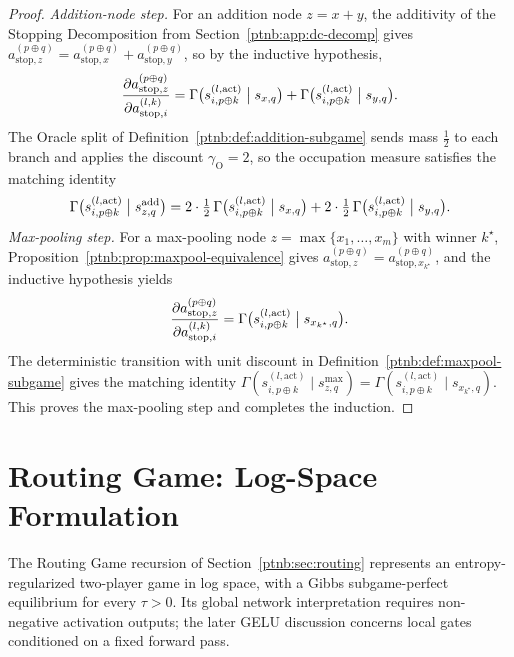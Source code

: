 \begin{proof}
\emph{Addition-node step.} For an addition node $z = x + y$, the additivity of the Stopping
Decomposition from Section~\ref{ptnb:app:dc-decomp} gives $a_{\mathrm{stop},z}^{(p \oplus q)} =
    a_{\mathrm{stop},x}^{(p \oplus q)} + a_{\mathrm{stop},y}^{(p \oplus q)}$, so by the inductive
hypothesis,
\begin{align}
    \frac{\partial a_{\mathrm{stop},z}^{(p \oplus q)}}{\partial a_{\mathrm{stop},i}^{(l, k)}}
    = \Gamma\bigl(s_{i, p \oplus k}^{(l, \mathrm{act})} \bigm| s_{x,q}\bigr) + \Gamma\bigl(s_{i, p
    \oplus k}^{(l, \mathrm{act})} \bigm| s_{y,q}\bigr).
\end{align}
The Oracle split of Definition~\ref{ptnb:def:addition-subgame} sends mass $\tfrac12$ to each branch and
applies the discount $\gamma_{\mathrm{O}} = 2$, so the occupation measure satisfies the matching
identity
\begin{align}
    \Gamma\bigl(s_{i, p \oplus k}^{(l, \mathrm{act})} \bigm| s_{z,q}^{\mathrm{add}}\bigr)
    = 2 \cdot \tfrac{1}{2}\, \Gamma\bigl(s_{i, p \oplus k}^{(l, \mathrm{act})} \bigm| s_{x,q}\bigr)
    + 2 \cdot \tfrac{1}{2}\, \Gamma\bigl(s_{i, p \oplus k}^{(l, \mathrm{act})} \bigm| s_{y,q}\bigr).
\end{align}
\emph{Max-pooling step.} For a max-pooling node $z = \max\{x_1, \dots, x_m\}$ with winner
$k^\star$, Proposition~\ref{ptnb:prop:maxpool-equivalence} gives $a_{\mathrm{stop},z}^{(p \oplus q)} =
    a_{\mathrm{stop},x_{k^\star}}^{(p \oplus q)}$, and the inductive hypothesis yields
\begin{align}
    \frac{\partial a_{\mathrm{stop},z}^{(p \oplus q)}}{\partial a_{\mathrm{stop},i}^{(l, k)}}
    = \Gamma\bigl(s_{i, p \oplus k}^{(l, \mathrm{act})} \bigm| s_{x_{k^\star},q}\bigr).
\end{align}
The deterministic transition with unit discount in Definition~\ref{ptnb:def:maxpool-subgame} gives the
matching identity $\Gamma(s_{i, p \oplus k}^{(l, \mathrm{act})} \mid s_{z,q}^{\max}) = \Gamma(s_{i,
    p \oplus k}^{(l, \mathrm{act})} \mid s_{x_{k^\star},q})$. This proves the max-pooling step and completes the induction.
\end{proof}
\par\medskip
\section{Routing Game: Log-Space Formulation}\label{ptnb:app:routing-formal}

The Routing Game recursion of Section~\ref{ptnb:sec:routing} represents an entropy-regularized
two-player game in log space, with a Gibbs subgame-perfect equilibrium for every $\tau>0$.
Its global network interpretation requires non-negative activation outputs; the later GELU discussion concerns local gates conditioned on a fixed forward pass.

